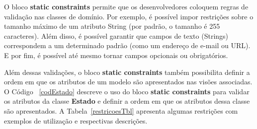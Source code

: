 \vspace{0.2cm}

\noindent  O  bloco {\bf  static  constraints}  permite  que os  desenvolvedores
coloquem regras  de validação nas classes  de domínio.  Por  exemplo, é possível
impor restrições  sobre o tamanho  máximo de um  atributo String (por  padrão, o
tamanho é 255 caracteres).  Além disso,  é possível garantir que campos de texto
(Strings) correspondem  a um determinado padrão  (como um endereço  de e-mail ou
URL). E por fim, é possível até mesmo tornar campos opcionais ou obrigatórios.

\vspace{0.2cm}

Além  dessas validações,  o bloco  {\bf static  constraints}  também possibilita
definir a  ordem em que  os atributos de  um modelo são apresentados  nas visões
associadas.   O Código  ~\ref{codEstado} descreve  o  uso do  bloco {\bf  static
  constraints}  para validar os  atributos da  classe {\bf  Estado} e  definir a
ordem   em    que   os   atributos    dessa   classe   são    apresentados.    A
Tabela~\ref{restricoesTbl}   apresenta  algumas   restrições  com   exemplos  de
utilização e respectivas descrições.

\vspace{0.2cm}

